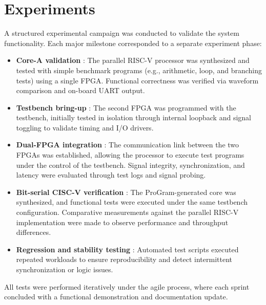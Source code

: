 \documentclass[10pt,twocolumn]{article}
\begin{document}
\section{Experiments}
A structured experimental campaign was conducted to validate the system functionality. Each major milestone corresponded to a separate experiment phase:
\begin{itemize}
  \item \textbf{Core-A validation} : The parallel RISC-V processor was synthesized and tested with simple benchmark programs (e.g., arithmetic, loop, and branching tests) using a single FPGA. Functional correctness was verified via waveform comparison and on-board UART output.
  \item \textbf{Testbench bring-up} : The second FPGA was programmed with the testbench, initially tested in isolation through internal loopback and signal toggling to validate timing and I/O drivers.
  \item \textbf{Dual-FPGA integration} : The communication link between the two FPGAs was established, allowing the processor to execute test programs under the control of the testbench. Signal integrity, synchronization, and latency were evaluated through test logs and signal probing.
  \item \textbf{Bit-serial CISC-V verification} : The ProGram-generated core was synthesized, and functional tests were executed under the same testbench configuration. Comparative measurements against the parallel RISC-V implementation were made to observe performance and throughput differences.
  \item \textbf{Regression and stability testing} : Automated test scripts executed repeated workloads to ensure reproducibility and detect intermittent synchronization or logic issues.
\end{itemize}
All tests were performed iteratively under the agile process, where each sprint concluded with a functional demonstration and documentation update.
\end{document}
